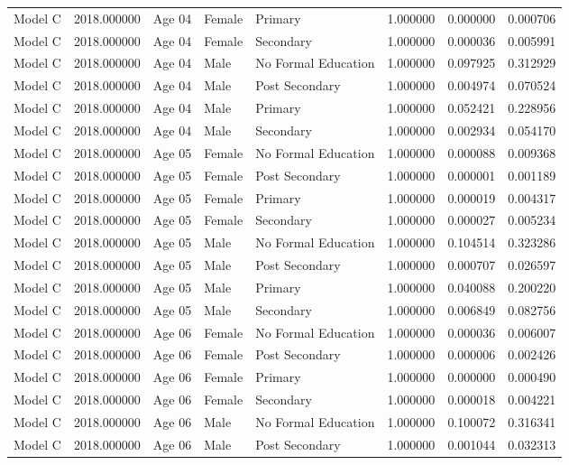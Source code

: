 \begin{table}[ht]
\begin{tabular}{lrlllrrr}
Model C & 2018.000000 & Age 04 & Female & Primary & 1.000000 & 0.000000 & 0.000706 \\
Model C & 2018.000000 & Age 04 & Female & Secondary & 1.000000 & 0.000036 & 0.005991 \\
Model C & 2018.000000 & Age 04 & Male & No Formal Education & 1.000000 & 0.097925 & 0.312929 \\
Model C & 2018.000000 & Age 04 & Male & Post Secondary & 1.000000 & 0.004974 & 0.070524 \\
Model C & 2018.000000 & Age 04 & Male & Primary & 1.000000 & 0.052421 & 0.228956 \\
Model C & 2018.000000 & Age 04 & Male & Secondary & 1.000000 & 0.002934 & 0.054170 \\
Model C & 2018.000000 & Age 05 & Female & No Formal Education & 1.000000 & 0.000088 & 0.009368 \\
Model C & 2018.000000 & Age 05 & Female & Post Secondary & 1.000000 & 0.000001 & 0.001189 \\
Model C & 2018.000000 & Age 05 & Female & Primary & 1.000000 & 0.000019 & 0.004317 \\
Model C & 2018.000000 & Age 05 & Female & Secondary & 1.000000 & 0.000027 & 0.005234 \\
Model C & 2018.000000 & Age 05 & Male & No Formal Education & 1.000000 & 0.104514 & 0.323286 \\
Model C & 2018.000000 & Age 05 & Male & Post Secondary & 1.000000 & 0.000707 & 0.026597 \\
Model C & 2018.000000 & Age 05 & Male & Primary & 1.000000 & 0.040088 & 0.200220 \\
Model C & 2018.000000 & Age 05 & Male & Secondary & 1.000000 & 0.006849 & 0.082756 \\
Model C & 2018.000000 & Age 06 & Female & No Formal Education & 1.000000 & 0.000036 & 0.006007 \\
Model C & 2018.000000 & Age 06 & Female & Post Secondary & 1.000000 & 0.000006 & 0.002426 \\
Model C & 2018.000000 & Age 06 & Female & Primary & 1.000000 & 0.000000 & 0.000490 \\
Model C & 2018.000000 & Age 06 & Female & Secondary & 1.000000 & 0.000018 & 0.004221 \\
Model C & 2018.000000 & Age 06 & Male & No Formal Education & 1.000000 & 0.100072 & 0.316341 \\
Model C & 2018.000000 & Age 06 & Male & Post Secondary & 1.000000 & 0.001044 & 0.032313 \\

\end{tabular}
\end{table}
